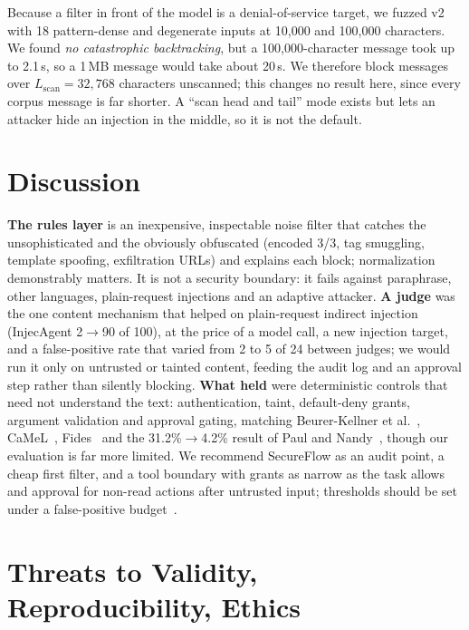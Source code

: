\documentclass[conference]{IEEEtran}
\begin{document}
Because a filter in front of the model is a denial-of-service target, we fuzzed v2 with
18 pattern-dense and degenerate inputs at 10{,}000 and 100{,}000 characters. We found
\emph{no catastrophic backtracking}, but a 100{,}000-character message took up to
2.1\,s, so a 1\,MB message would take about 20\,s. We therefore block messages over
$L_{\mathrm{scan}}=32{,}768$ characters unscanned; this changes no result here, since
every corpus message is far shorter. A ``scan head and tail'' mode exists but lets an
attacker hide an injection in the middle, so it is not the default.

\section{Discussion}

\textbf{The rules layer} is an inexpensive, inspectable noise filter that catches the
unsophisticated and the obviously obfuscated (encoded 3/3, tag smuggling, template
spoofing, exfiltration URLs) and explains each block; normalization demonstrably
matters. It is not a security boundary: it fails against paraphrase, other languages,
plain-request injections and an adaptive attacker. \textbf{A judge} was the one content
mechanism that helped on plain-request indirect injection (InjecAgent 2$\to$90 of 100),
at the price of a model call, a new injection target, and a false-positive rate that
varied from 2 to 5 of 24 between judges; we would run it only on untrusted or tainted
content, feeding the audit log and an approval step rather than silently blocking.
\textbf{What held} were deterministic controls that need not understand the text:
authentication, taint, default-deny grants, argument validation and approval gating,
matching Beurer-Kellner et al.~\cite{beurerkellner2025patterns},
CaMeL~\cite{debenedetti2025camel}, Fides~\cite{costa2025fides} and the 31.2\%$\to$4.2\%
result of Paul and Nandy~\cite{paul2026beyond}, though our evaluation is far more
limited. We recommend SecureFlow as an audit point, a cheap first filter, and a tool
boundary with grants as narrow as the task allows and approval for non-read actions
after untrusted input; thresholds should be set under a false-positive
budget~\cite{liu2024formalizing}.

\section{Threats to Validity, Reproducibility, Ethics}
\label{sec:threats}
\end{document}
